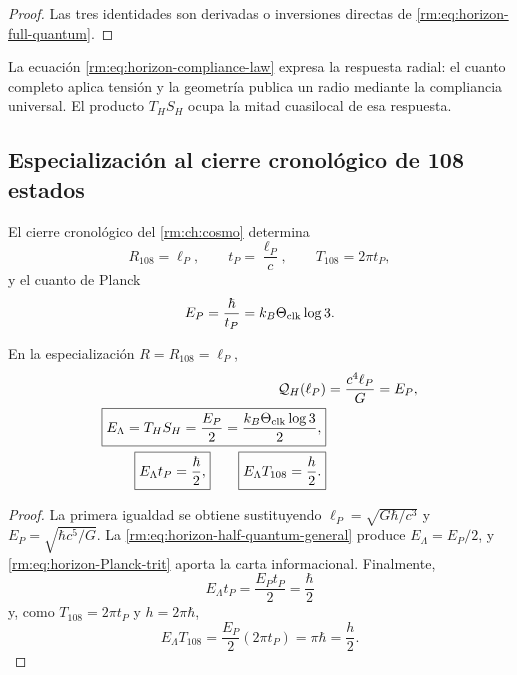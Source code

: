 \begin{proof}
Las tres identidades son derivadas o inversiones directas de
\cref{rm:eq:horizon-full-quantum}.
\end{proof}

La ecuaci\'on \cref{rm:eq:horizon-compliance-law} expresa la respuesta radial:
el cuanto completo aplica tensi\'on y la geometr\'ia publica un radio mediante
la compliancia universal. El producto \(T_HS_H\) ocupa la mitad cuasilocal
de esa respuesta.

\subsection{Especializaci\'on al cierre cronol\'ogico de 108 estados}

El cierre cronol\'ogico del \cref{rm:ch:cosmo} determina
\begin{equation}
 R_{108}=\ell_P,
 \qquad
 t_P=\frac{\ell_P}{c},
 \qquad
 T_{108}=2\pi t_P,
 \label{rm:eq:horizon-CT108-scales}
\end{equation}
y el cuanto de Planck
\begin{equation}
 E_P=\frac{\hbar}{t_P}
 =k_B\Theta_{\rm clk}\log3.
 \label{rm:eq:horizon-Planck-trit}
\end{equation}

\begin{theorem}
\label{rm:thm:horizon-half-action}
En la especializaci\'on \(R=R_{108}=\ell_P\),
\begin{align}
 \mathcal Q_H(\ell_P)
 &=\frac{c^4\ell_P}{G}=E_P,
 \label{rm:eq:horizon-QH-EP}\\
 \boxed{
 E_\Lambda=T_HS_H
 =\frac{E_P}{2}
 =\frac{k_B\Theta_{\rm clk}\log3}{2},}
 \label{rm:eq:horizon-CT108-half-energy}\\
 \boxed{E_\Lambda t_P=\frac{\hbar}{2},}
 \qquad
 \boxed{E_\Lambda T_{108}=\frac h2.}
 \label{rm:eq:horizon-half-actions}
\end{align}
\end{theorem}

\begin{proof}
La primera igualdad se obtiene sustituyendo
\(\ell_P=\sqrt{G\hbar/c^3}\) y
\(E_P=\sqrt{\hbar c^5/G}\). La
\cref{rm:eq:horizon-half-quantum-general} produce
\(E_\Lambda=E_P/2\), y
\cref{rm:eq:horizon-Planck-trit} aporta la carta informacional. Finalmente,
\[
 E_\Lambda t_P=\frac{E_Pt_P}{2}=\frac\hbar2
\]
y, como \(T_{108}=2\pi t_P\) y \(h=2\pi\hbar\),
\[
 E_\Lambda T_{108}
 =\frac{E_P}{2}(2\pi t_P)=\pi\hbar=\frac h2.
\]
\end{proof}

